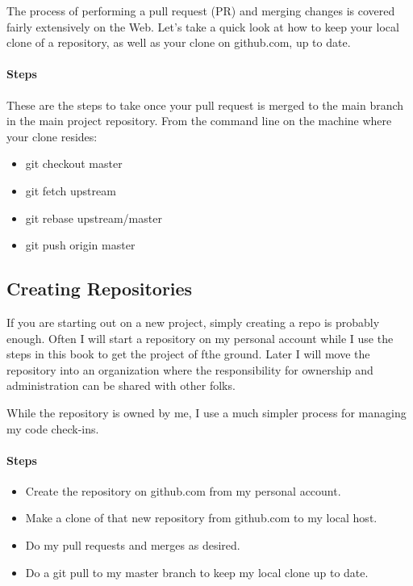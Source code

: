 The process of performing a pull request (PR) and merging changes is
covered fairly extensively on the Web. Let's take a quick look at how to
keep your local clone of a repository, as well as your clone on
github.com, up to date.

\hypertarget{steps-1}{%
  \paragraph{Steps}\label{steps-1}}

These are the steps to take once your pull request is merged to the main
branch in the main project repository. From the command line on the
machine where your clone resides:

\begin{itemize}
  \item
        git checkout master
  \item
        git fetch upstream
  \item
        git rebase upstream/master
  \item
        git push origin master
\end{itemize}


\subsection{Creating Repositories}

\justify
If you are starting out on a new project, simply creating a repo is
probably enough. Often I will start a repository on my personal account
while I use the steps in this book to get the project of fthe ground.
Later I will move the repository into an organization where the
responsibility for ownership and administration can be shared with other
folks.

\justify
While the repository is owned by me, I use a much simpler process for
managing my code check-ins.

\hypertarget{steps-2}{%
  \paragraph{Steps}\label{steps-2}}

\begin{itemize}

  \item
        Create the repository on github.com from my personal account.
  \item
        Make a clone of that new repository from github.com to my local host.
  \item
        Do my pull requests and merges as desired.
  \item
        Do a git pull to my master branch to keep my local clone up to date.
\end{itemize}


